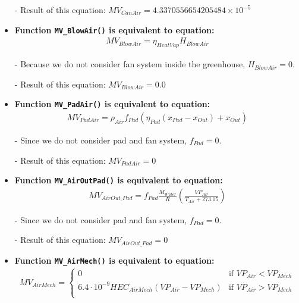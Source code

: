 \documentclass[a4paper]{article}
\numberwithin{equation}{section}
\begin{document}
\begin{itemize}
  \item[-] Result of this equation: \(MV_{CanAir} = 4.3370556654205484 \times 10^{-5}\)

  \item \textbf{Function \texttt{MV\_BlowAir()} is equivalent to equation:}
        \begin{align*}
          MV_{BlowAir} = \eta_{HeatVap} H_{BlowAir}
        \end{align*}

  \item[-] Because we do not consider fan system inside the greenhouse, \(H_{BlowAir} = 0\).
  \item[-] Result of this equation: \(MV_{BlowAir} = 0.0\)

  \item \textbf{Function \texttt{MV\_PadAir()} is equivalent to equation:}
        \begin{align*}
          MV_{PadAir} = \rho_{Air} f_{Pad} (\eta_{Pad} (x_{Pad} - x_{Out}) + x_{Out})
        \end{align*}

  \item[-] Since we do not consider pad and fan system, \(f_{Pad} = 0\).
  \item[-] Result of this equation: \(MV_{PadAir} = 0\)

  \item \textbf{Function \texttt{MV\_AirOutPad()} is equivalent to equation:}
        \begin{align*}
          MV_{AirOut\_Pad} = f_{Pad}
          \frac{M_{Water}}{R} \left(\frac{VP_{Air}}{T_{Air} + 273.15}\right)
        \end{align*}

  \item[-] Since we do not consider pad and fan system, \(f_{Pad} = 0\).
  \item[-] Result of this equation: \(MV_{AirOut\_Pad} = 0\)

  \item \textbf{Function \texttt{MV\_AirMech()} is equivalent to equation:}
        \begin{align*}
          MV_{AirMech} = \begin{cases}
            0                                                     & \text{if~} VP_{Air} < VP_{Mech} \\
            6.4 \cdot 10^{-9} HEC_{AirMech}(VP_{Air} - VP_{Mech}) & \text{if~} VP_{Air} > VP_{Mech} \\
          \end{cases}
        \end{align*}


\end{itemize}
\end{document}
